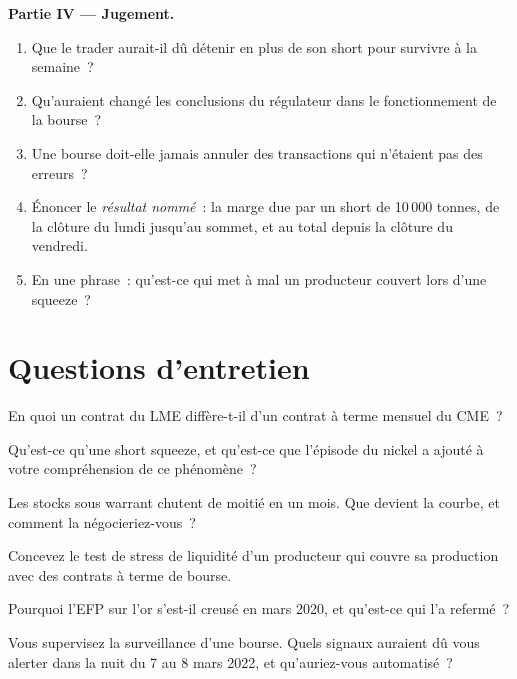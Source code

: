 \begin{problem}
\medskip\noindent\textbf{Partie IV --- Jugement.}
\begin{enumerate}[resume]
\item Que le trader aurait-il dû détenir en plus de son short pour survivre à la semaine~?
\item Qu'auraient changé les conclusions du régulateur dans le fonctionnement de la bourse~?
\item Une bourse doit-elle jamais annuler des transactions qui n'étaient pas des erreurs~?
\item Énoncer le \emph{résultat nommé}~: la marge due par un short de 10\,000 tonnes, de la clôture du lundi
jusqu'au sommet, et au total depuis la clôture du vendredi.
\item En une phrase~: qu'est-ce qui met à mal un producteur couvert lors d'une squeeze~?
\end{enumerate}
\end{problem}

\section{Questions d'entretien}

\begin{interviewq}\label{iq:m3:metals:1}
En quoi un contrat du LME diffère-t-il d'un contrat à terme mensuel du CME~?
\end{interviewq}

\begin{interviewq}\label{iq:m3:metals:2}
Qu'est-ce qu'une short squeeze, et qu'est-ce que l'épisode du nickel a ajouté à votre compréhension de ce phénomène~?
\end{interviewq}

\begin{interviewq}\label{iq:m3:metals:3}
Les stocks sous warrant chutent de moitié en un mois. Que devient la courbe, et comment la négocieriez-vous~?
\end{interviewq}

\begin{interviewq}\label{iq:m3:metals:4}
Concevez le test de stress de liquidité d'un producteur qui couvre sa production avec des contrats à terme de bourse.
\end{interviewq}

\begin{interviewq}\label{iq:m3:metals:5}
Pourquoi l'EFP sur l'or s'est-il creusé en mars 2020, et qu'est-ce qui l'a refermé~?
\end{interviewq}

\begin{interviewq}\label{iq:m3:metals:6}
Vous supervisez la surveillance d'une bourse. Quels signaux auraient dû vous alerter dans la nuit du 7 au 8 mars
2022, et qu'auriez-vous automatisé~?
\end{interviewq}
